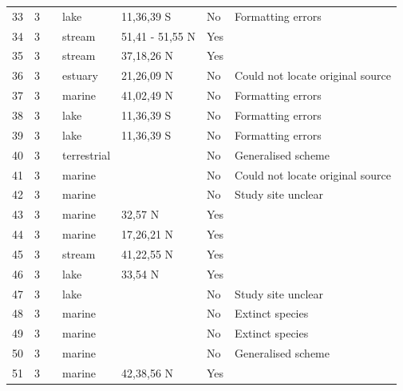 \documentclass[12pt]{article}
\begin{document}
\begin{landscape}
\begin{table}[h!]
{\begin{tabular}{p{2.8cm}p{1.3cm}p{3cm}p{2.2cm}p{2.5cm}lp{8.2cm}}
        33    & 3 & \cite{Fryer1959} & lake & 11,36,39 S & No  &  Formatting errors     \\
        34    & 3 & \cite{Jones1949}     & stream & 51,41 - 51,55 N & Yes   &       \\
        35    & 3 & \cite{Minshall1967}    & stream & 37,18,26 N & Yes   &       \\
        36    & 3 & \cite{Walsh1967}  & estuary & 21,26,09 N & No    & Could not locate original source \\
        37    & 3 & \cite{Clarke1967}    & marine & 41,02,49 N & No  &  Formatting errors     \\
        38    & 3 & \cite{Fryer1959} & lake & 11,36,39 S & No  &  Formatting errors     \\
        39    & 3 & \cite{Fryer1959} & lake & 11,36,39 S & No  &  Formatting errors     \\
        40    & 3 & \cite{Harrison1962}  & terrestrial &       & No    & Generalised scheme \\
        41    & 3 & \cite{Parin1970}  & marine &       & No    & Could not locate original source \\
        42    & 3 & \cite{Vinogradov1978}  & marine &       & No    & Study site unclear \\
        43    & 3 & \cite{Rosenthal1974}    & marine & 32,57 N & Yes   &       \\
        44    & 3 & \cite{Yanez1978}  & marine & 17,26,21 N & Yes   &       \\
        45    & 3 & \cite{Tilly1968}    & stream & 41,22,55 N & Yes   &       \\
        46    & 3 & \cite{Patten1975}    & lake & 33,54 N & Yes   &       \\
        47    & 3 & \cite{Harris1980}    & lake &       & No    & Study site unclear \\
        48    & 3 & \cite{Simenstad1978}    & marine &       & No    & Extinct species \\
        49    & 3 & \cite{Simenstad1978}    & marine &       & No    & Extinct species \\
        50    & 3 & \cite{Nybakken1982}    & marine &       & No    & Generalised scheme \\
        51    & 3 & \cite{Dexter1947}    & marine & 42,38,56 N & Yes   &       \\
      \hline
      \end{tabular}}%
      \end{table}


\end{landscape}
\end{document}
